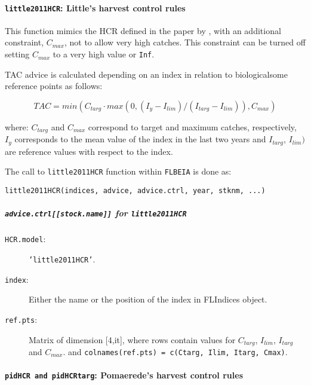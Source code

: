   \paragraph{\texttt{little2011HCR}: Little's harvest control rules} \hspace{0pt} \smallskip

  This function mimics the HCR defined in the paper by \cite{Littel2011}, with an additional constraint, $C_{max}$, not to allow very high catches. This constraint can be turned off setting $C_{max}$ to a very high value or \texttt{Inf}.
  
  
  
  TAC advice is calculated depending on an index in relation to biologicalsome reference points as follows:

  \begin{equation}
  	TAC = min( C_{targ} \cdot max(0,(I_{y}-I_{lim})/(I_{targ}-I_{lim})), C_{max})
  \end{equation}

  \noindent where: $C_{targ}$ and $C_{max}$ correspond to target and maximum catches, respectively, 
  $I_{y}$ corresponds to the mean value of the index in the last two years and $I_{targ}$, $I_{lim})$ are reference values with respect to the index.


  The call to \texttt{little2011HCR} function within \texttt{FLBEIA} is done as:

	\begin{center}
		\texttt{little2011HCR(indices, advice, advice.ctrl, year, stknm, ...)}
	\end{center}

	\subparagraph{\texttt{advice.ctrl[[stock.name]]} for \texttt{little2011HCR}}

	\begin{description}
	    \item[\texttt{HCR.model}:] \texttt{'little2011HCR'}.
	    \item[\texttt{index}:] Either the name or the position of the index in FLIndices object.
		  \item[\texttt{ref.pts}:] Matrix of dimension [4,it], 
		    where rows contain values for $C_{targ}$, $I_{lim}$, $I_{targ}$  and $C_{max}$.
		    and \texttt{colnames(ref.pts) = c(Ctarg, Ilim, Itarg, Cmax)}.
	\end{description}
  

  \paragraph{\texttt{pidHCR and pidHCRtarg}: Pomaerede's harvest control rules} \hspace{0pt} \smallskip

